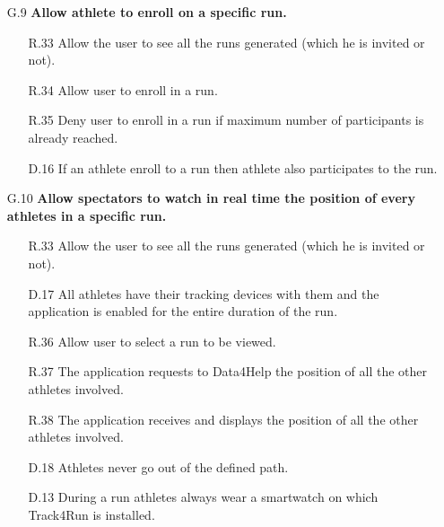 \begin{enumerate}
\begin{enumerate}
	\item [G.9] \textbf{Allow athlete to enroll on a specific run.}
		\begin{enumerate}
		\item [R.33] Allow the user to see all the runs generated (which he is invited or not).
		\item [R.34] Allow user to enroll in a run.
		\item [R.35] Deny user to enroll in a run if maximum number of participants is already reached.
		\item [D.16] If an athlete enroll to a run then athlete also participates to the run.
		\end{enumerate}
	
	\item [G.10] \textbf{Allow spectators to watch in real time the position of every athletes in a specific run.}
		\begin{enumerate}
		\item [R.33] Allow the user to see all the runs generated (which he is invited or not).
		\item [D.17] All athletes have their tracking devices with them and the application is enabled for the entire duration of the run.	
		\item [R.36] Allow user to select a run to be viewed.
		\item [R.37] The application requests to Data4Help the position of all the other athletes involved.
		\item [R.38] The application receives and displays the position of all the other athletes involved.
		\item [D.18] Athletes never go out of the defined path.
		\item [D.13] During a run athletes always wear a smartwatch on which Track4Run is installed.
		\end{enumerate}
	\end{enumerate}

\end{enumerate}
\clearpage

